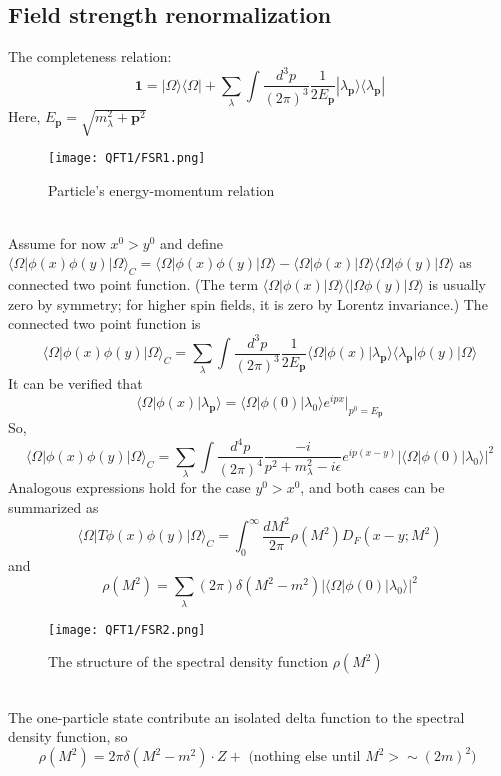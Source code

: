 \subsection{Field strength renormalization}
\noindent
The completeness relation:
\[\bm{1} = |\Omega\rangle\langle\Omega| +  \sum_{\lambda} \int \frac{d^3p}{(2\pi)^3} \frac{1}{2E_{\bm{p}}} |\lambda_{\bm{p}}\rangle\langle\lambda_{\bm{p}}|\]
Here, $E_{\bm{p}} = \sqrt{m_{\lambda}^2 + \bm{p}^2}$\\
\begin{figure}[!h]
\centering
\texttt{[image: QFT1/FSR1.png]}
\caption{Particle's energy-momentum relation}
\end{figure}
\\
Assume for now $x^0 > y^0$ and define $\langle \Omega | \phi(x) \phi(y) | \Omega \rangle_{C} = \langle \Omega | \phi(x) \phi(y) | \Omega \rangle - \langle \Omega | \phi(x)| \Omega \rangle \langle \Omega | \phi(y) | \Omega \rangle$ as connected two point function. (The term $\langle \Omega | \phi(x)| \Omega \rangle \langle | \Omega \phi(y) | \Omega \rangle$ is usually zero by symmetry; for higher spin fields, it is zero by Lorentz invariance.) The connected two point function is
\[\langle \Omega | \phi(x) \phi(y) | \Omega \rangle_{C} = \sum_{\lambda} \int \frac{d^3p}{(2\pi)^3} \frac{1}{2E_{\bm{p}}} \langle \Omega | \phi(x) |\lambda_{\bm{p}}\rangle\langle\lambda_{\bm{p}}| \phi(y) | \Omega \rangle\]
It can be verified that
\[\langle \Omega | \phi(x) |\lambda_{\bm{p}}\rangle = \langle \Omega | \phi(0) | \lambda_0 \rangle e^{ipx} |_{p^0 = E_{\bm{p}}}\]
So,
\[\langle \Omega | \phi(x) \phi(y) | \Omega \rangle_C = \sum_{\lambda} \int \frac{d^4p}{(2\pi)^4} \frac{-i}{p^2 + m_{\lambda}^2 -i\epsilon} e^{ip(x-y)} |\langle \Omega | \phi(0) | \lambda_0 \rangle|^2\]
Analogous expressions hold for the case $y^0 > x^0$, and both cases can be summarized as
\[\langle \Omega | T \phi(x) \phi(y) | \Omega \rangle_C = \int_0^{\infty} \frac{dM^2}{2\pi} \rho(M^2) D_F(x-y;M^2)\]
and 
\[\rho(M^2) = \sum_{\lambda} (2\pi) \delta(M^2-m^2)|\langle \Omega | \phi(0) | \lambda_0 \rangle|^2 \]
\begin{figure}[!h]
\centering
\texttt{[image: QFT1/FSR2.png]}
\caption{The structure of the spectral density function $\rho(M^2)$}
\end{figure}\\
The one-particle state contribute an isolated delta function to the spectral density function, so
\[\rho(M^2) = 2\pi \delta (M^2 -m^2) \cdot Z + \mbox{ (nothing else until $M^2 > \sim (2m)^2$) }\]
